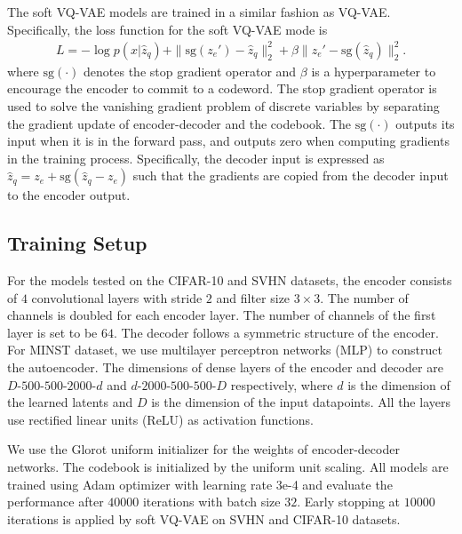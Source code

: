 \documentclass[letterpaper]{article} %
\begin{document}
 The soft VQ-VAE models are trained in a similar fashion as VQ-VAE. Specifically, the loss function for the soft VQ-VAE mode is
\begin{equation}
	\label{eq:loss1}
	\begin{split}
	L = -\log p(x|\hat{z}_q)+ \|\text{sg}\left(z_e'\right)-\hat{z}_q\|_2^2 + \beta\|z_e'- \text{sg}(\hat{z}_q)\|_2^2.
	\end{split}
\end{equation}
where $\text{sg}(\cdot)$ denotes the stop gradient operator and $\beta$ is a hyperparameter to encourage the encoder to commit to a codeword. The stop gradient operator is used to solve the vanishing gradient problem of discrete variables by separating the gradient update of encoder-decoder and the codebook.
The $\text{sg}(\cdot)$ outputs its input when it is in the
forward pass, and outputs zero when computing gradients in the training process.
Specifically, the decoder input is expressed as $\hat{z}_q = z_e + \text{sg}(\hat{z}_q-z_e)$ such that the gradients are copied from the decoder input to the encoder output.
\subsection{Training Setup}
  For the models tested on the CIFAR-10 and SVHN datasets, the encoder consists of $4$ convolutional layers with stride $2$ and filter size $3 \times 3$. The number of channels is doubled for each encoder layer. The number of channels of the first layer is set to be $64$. The decoder follows a symmetric structure of the encoder. For MINST dataset, we use multilayer perceptron networks (MLP) to construct the autoencoder. The dimensions of dense layers of the encoder and decoder are $D$-$500$-$500$-$2000$-$d$ and $d$-$2000$-$500$-$500$-$D$ respectively, where $d$ is the dimension of the learned latents and $D$ is the dimension of the input datapoints. All the layers use rectified linear units (ReLU) as activation functions.

  We use the Glorot uniform initializer \cite{pmlr-v9-glorot10a} for the weights of encoder-decoder networks. The codebook is initialized by the uniform unit scaling. All models are trained using Adam optimizer \cite{kingma:15:iclr} with learning rate 3e-4 and evaluate the performance after $40000$ iterations with batch size $32$. Early stopping at $10000$ iterations is applied by soft VQ-VAE on SVHN and CIFAR-10 datasets.
\end{document}
